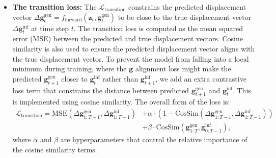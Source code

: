\begin{itemize}
    \item \textbf{The transition loss:} The $\mathcal{L}_{\text{transition}}$ constrains the predicted displacement vector $\Delta \boldsymbol{g}_t^{\text{gen}} = f_{\text{forward}}(\boldsymbol{z}_t, \boldsymbol{g}_t^{\text{gen}})$ to be close to the true displacement vector $\Delta \boldsymbol{g}_t^{\text{inf}}$ at time step $t$. The transition loss is computed as the mean squared error (MSE) between the predicted and true displacement vectors. Cosine similarity is also used to ensure the predicted displacement vector aligns with the true displacement vector.
    To prevent the model from falling into a local minimum during training, where the $\boldsymbol{g}$ alignment loss might make the predicted $\boldsymbol{g}_{t+1}^{\text{gen}}$ closer to $\boldsymbol{g}_{t}^{\text{inf}}$ rather than $\boldsymbol{g}_{t+1}^{\text{inf}}$, we add an extra contrastive loss term that constrains the distance between predicted $\boldsymbol{g}_{t+1}^{\text{gen}}$ and $\boldsymbol{g}_{t}^{\text{inf}}$. This is implemented using cosine similarity. The overall form of the loss is:
    \begin{equation}
        \begin{aligned}
            \mathcal{L}_{\text{transition}} = \text{MSE}(\Delta \boldsymbol{g}_{1:T-1}^{\text{gen}}, \Delta \boldsymbol{g}_{1:T-1}^{\text{inf}}) &+ \alpha \cdot \left( 1 - \text{CosSim}(\Delta \boldsymbol{g}_{1:T-1}^{\text{gen}}, \Delta \boldsymbol{g}_{1:T-1}^{\text{inf}}) \right)\\
            &+ \beta \cdot \text{CosSim}(\boldsymbol{g}_{1:T}^{\text{gen}}, \boldsymbol{g}_{0:T-1}^{\text{inf}}),
        \end{aligned}
    \end{equation}
    where $\alpha$ and $\beta$ are hyperparameters that control the relative importance of the cosine similarity terms. 


\end{itemize}
